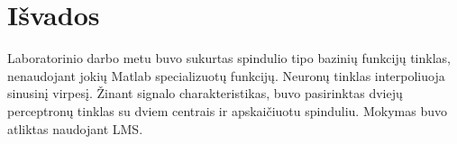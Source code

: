 \documentclass[11pt, a4paper, lithuanian]{article}
\begin{document}
    \section{Išvados}

    Laboratorinio darbo metu buvo sukurtas spindulio tipo bazinių funkcijų tinklas, nenaudojant jokių Matlab specializuotų funkcijų. Neuronų tinklas interpoliuoja sinusinį virpesį. Žinant signalo charakteristikas, buvo pasirinktas dviejų perceptronų tinklas su dviem centrais ir apskaičiuotu spinduliu. Mokymas buvo atliktas naudojant LMS.
\end{document}
